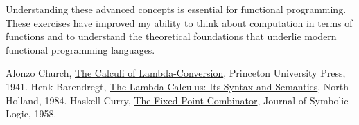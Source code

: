 \documentclass{article}
\theoremstyle{plain}
\theoremstyle{definition}
\theoremstyle{remark}
\begin{document}
Understanding these advanced concepts is essential for functional programming. These exercises have improved my ability to think about computation in terms of functions and to understand the theoretical foundations that underlie modern functional programming languages.

\begin{thebibliography}{99}
 Alonzo Church, \href{https://en.wikipedia.org/wiki/Lambda_calculus}{The Calculi of Lambda-Conversion}, Princeton University Press, 1941.
 Henk Barendregt, \href{https://en.wikipedia.org/wiki/Lambda_calculus}{The Lambda Calculus: Its Syntax and Semantics}, North-Holland, 1984.
 Haskell Curry, \href{https://en.wikipedia.org/wiki/Fixed-point_combinator}{The Fixed Point Combinator}, Journal of Symbolic Logic, 1958.
\end{thebibliography}
\end{document}
